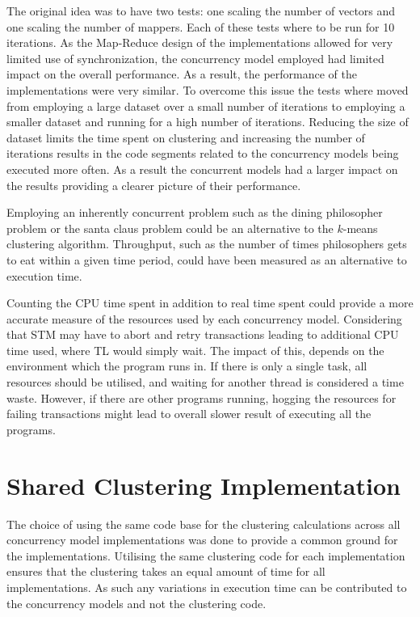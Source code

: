 The original idea was to have two tests: one scaling the number of vectors and one scaling the number of mappers. Each of these tests where to be run for 10 iterations. As the Map-Reduce design of the implementations allowed for very limited use of synchronization, the concurrency model employed had limited impact on the overall performance. As a result, the performance of the implementations were very similar. To overcome this issue the tests where moved from employing a large dataset over a small number of iterations to employing a smaller dataset and running for a high number of iterations. Reducing the size of dataset limits the time spent on clustering and increasing the number of iterations results in the code segments related to the concurrency models being executed more often. As a result the concurrent models had a larger impact on the results providing a clearer picture of their performance.

Employing an inherently concurrent problem such as the dining philosopher problem\cite[p. 673]{hoare1978communicating} or the santa claus problem\cite{trono1994new} could be an alternative to the $k$-means clustering algorithm. Throughput, such as the number of times philosophers gets to eat within a given time period, could have been measured as an alternative to execution time.

Counting the CPU time spent in addition to real time spent could provide a more accurate measure of the resources used by each concurrency model. Considering that \ac{STM} may have to abort and retry transactions leading to additional CPU time used, where \ac{TL} would simply wait. The impact of this, depends on the environment which the program runs in. If there is only a single task, all resources should be utilised, and waiting for another thread is considered a time waste. However, if there are other programs running, hogging the resources for failing transactions might lead to overall slower result of executing all the programs.

\section{Shared Clustering Implementation}
The choice of using the same code base for the clustering calculations across all concurrency model implementations was done to provide a common ground for the implementations. Utilising the same clustering code for each implementation ensures that the clustering takes an equal amount of time for all implementations. As such any variations in execution time can be contributed to the concurrency models and not the clustering code. 

